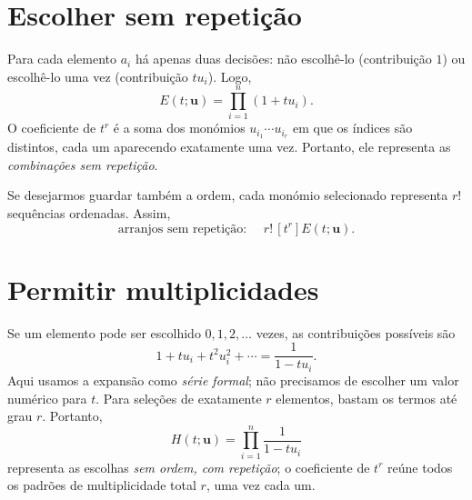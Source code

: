 \documentclass[11pt,a4paper,oneside]{book}
\begin{document}
\section{Escolher sem repetição}
Para cada elemento $a_i$ há apenas duas decisões: não escolhê-lo (contribuição $1$) ou escolhê-lo uma vez (contribuição $tu_i$). Logo,
\[E(t;\mathbf u)=\prod_{i=1}^n(1+tu_i).\]
O coeficiente de $t^r$ é a soma dos monómios $u_{i_1}\cdots u_{i_r}$ em que os índices são distintos, cada um aparecendo exatamente uma vez. Portanto, ele representa as \emph{combinações sem repetição}.

Se desejarmos guardar também a ordem, cada monómio selecionado representa $r!$ sequências ordenadas. Assim,
\[
\text{arranjos sem repetição: }\quad r!\,[t^r]E(t;\mathbf u).
\]
\section{Permitir multiplicidades}
Se um elemento pode ser escolhido $0,1,2,\ldots$ vezes, as contribuições possíveis são
\[1+tu_i+t^2u_i^2+\cdots=\frac1{1-tu_i}.\]
Aqui usamos a expansão como \emph{série formal}; não precisamos de escolher um valor numérico para $t$. Para seleções de exatamente $r$ elementos, bastam os termos até grau $r$. Portanto,
\[H(t;\mathbf u)=\prod_{i=1}^n\frac1{1-tu_i}
\]
representa as escolhas \emph{sem ordem, com repetição}; o coeficiente de $t^r$ reúne todos os padrões de multiplicidade total $r$, uma vez cada um.
\end{document}
